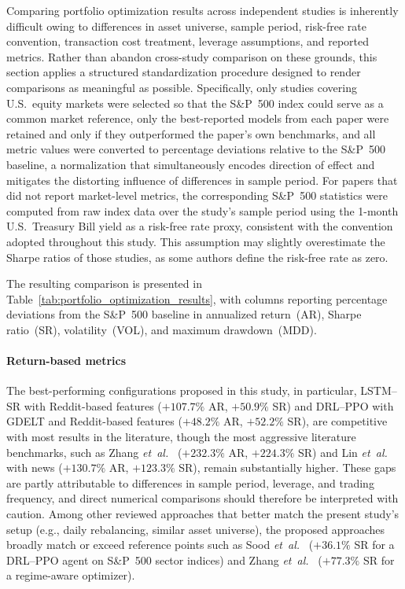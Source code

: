 Comparing portfolio optimization results across independent studies is inherently difficult owing to differences in asset universe, sample period, risk-free rate convention, transaction cost treatment, leverage assumptions, and reported metrics. Rather than abandon cross-study comparison on these grounds, this section applies a structured standardization procedure designed to render comparisons as meaningful as possible. Specifically, only studies covering U.S.\ equity markets were selected so that the S\&P~500 index could serve as a common market reference, only the best-reported models from each paper were retained and only if they outperformed the paper's own benchmarks, and all metric values were converted to percentage deviations relative to the S\&P~500 baseline, a normalization that simultaneously encodes direction of effect and mitigates the distorting influence of differences in sample period. For papers that did not report market-level metrics, the corresponding S\&P~500 statistics were computed from raw index data over the study's sample period using the 1-month U.S.\ Treasury Bill yield as a risk-free rate proxy, consistent with the convention adopted throughout this study. This assumption may slightly overestimate the Sharpe ratios of those studies, as some authors define the risk-free rate as zero.

The resulting comparison is presented in Table~\ref{tab:portfolio_optimization_results}, with columns reporting percentage deviations from the S\&P~500 baseline in annualized return~(AR), Sharpe ratio~(SR), volatility~(VOL), and maximum drawdown~(MDD).

\paragraph{Return-based metrics} The best-performing configurations proposed in this study, in particular, LSTM--SR with Reddit-based features ($+107.7\%$ AR, $+50.9\%$ SR) and DRL--PPO with GDELT and Reddit-based features ($+48.2\%$ AR, $+52.2\%$ SR), are competitive with most results in the literature, though the most aggressive literature benchmarks, such as Zhang \emph{et~al.}~\cite{984be} ($+232.3\%$ AR, $+224.3\%$ SR) and Lin \emph{et~al.}~\cite{e6ca3} with news ($+130.7\%$ AR, $+123.3\%$ SR), remain substantially higher. These gaps are partly attributable to differences in sample period, leverage, and trading frequency, and direct numerical comparisons should therefore be interpreted with caution. Among other reviewed approaches that better match the present study's setup (e.g., daily rebalancing, similar asset universe), the proposed approaches broadly match or exceed reference points such as Sood \emph{et~al.}~\cite{0df79} ($+36.1\%$ SR for a DRL--PPO agent on S\&P~500 sector indices) and Zhang \emph{et~al.}~\cite{4e332} ($+77.3\%$ SR for a regime-aware optimizer).

